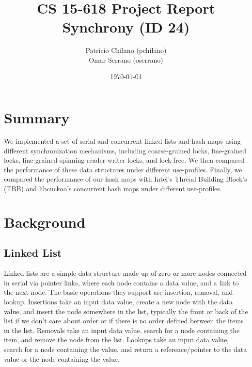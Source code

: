 \documentclass[11pt]{article}
\title{\vspace{-25pt}
\huge CS 15-618 Project Report \\
\huge Synchrony (ID 24)
}
\author{
    Patricio Chilano (pchilano) \\
    Omar Serrano (oserrano)
}
\date{\today}
\begin{document}


\maketitle

\section{Summary}
We implemented a set of serial and concurrent linked lists and hash maps using
different synchronization mechanisms, including coarse-grained locks,
fine-grained locks, fine-grained spinning-reader-writer locks, and lock free. We
then compared the performance of these data structures under different
use-profiles. Finally, we compared the performance of our hash maps with Intel's
Thread Building Block's (TBB) and libcuckoo's concurrent hash maps under different
use-profiles.

\section{Background}

\subsection{Linked List} \label{ssec:bglist}
Linked lists are a simple data structure made up of zero or more nodes connected
in serial via pointer links, where each node contains a data value, and a link
to the next node. The basic operations they support are insertion, removal, and
lookup. Insertions take an input data value, create a new node with the data
value, and insert the node somewhere in the list, typically the front or back of
the list if we don't care about order or if there is no order defined between
the items in the list. Removals take an input data value, search for a node
containing the item, and remove the node from the list. Lookups take an input
data value, search for a node containing the value, and return a
reference/pointer to the data value or the node containing the value.
\end{document}
